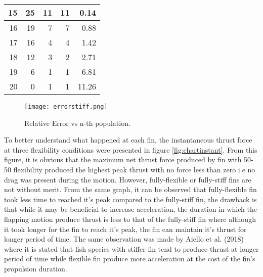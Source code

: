 \begin{table}[H]
\begin{tabular}{|r|r|r|r|r|}
\hline
15 & 25                                                              & 11                                                              & 11                                                                  & 0.14                                                  \\ 
\hline
16 & 19                                                              & 7                                                               & 7                                                                   & 0.88                                                  \\ 
\hline
17 & 16                                                              & 4                                                               & 4                                                                   & 1.42                                                  \\ 
\hline
18 & 12                                                    & 3                                                               & 2                                                                   & 2.71                                                  \\ 
\hline
19 & 6                                                               & 1                                                               & 1                                                                   & 6.81                                                  \\ 
\hline
20 & 0                                                               & 1                                                            & 1                                                                   & 11.26                                                 \\
\hline
\end{tabular}
\label{tab:tableresult}
\end{table}
\begin{figure}[H]
    \centering
    \texttt{[image: errorstiff.png]}
    \caption{Relative Error vs n-th population.}
    \label{fig:errorfre}
\end{figure}
To better understand what happened at each fin, the instantaneous thrust force at three flexibility conditions were presented in figure \ref{fig:chartinstant}. From this figure, it is obvious that the maximum net thrust force produced by fin with 50-50 flexibility produced the highest peak thrust with no force less than zero i.e no drag was present during the motion. However, fully-flexible or fully-stiff fins are not without merit. From the same graph, it can be observed that fully-flexible fin took less time to reached it's peak compared to the fully-stiff fin, the drawback is that while it may be beneficial to increase acceleration, the duration in which the flapping motion produce thrust is less to that of the fully-stiff fin where although it took longer for the fin to reach it's peak, the fin can maintain it's thrust for longer period of time. The same observation was made by Aiello et al. (2018) where it is stated that fish species with stiffer fin tend to produce thrust at longer period of time while flexible fin produce more acceleration at the cost of the fin's propulsion duration.
